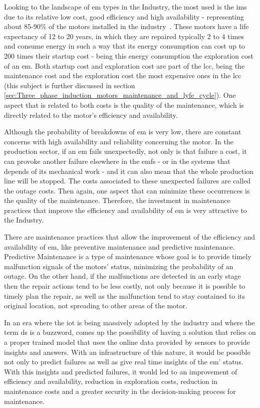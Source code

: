 Looking to the landscape of \acrshort{em} types in the Industry, the most used is the \acrfull{ims} due to its relative low cost, good efficiency and high availability - representing about 85-90\% of the motors installed in the industry~\cite{Ferreira1}. 
These motors have a life expectancy of 12 to 20 years, in which they are repaired typically 2 to 4 times and consume energy in such a way that its energy consumption can cost up to 200 times their startup cost - being this energy consumption the exploration cost of an \acrshort{em}. 
Both startup cost and exploration cost are part of the \acrfull{lcc}, being the maintenance cost and the exploration cost the most expensive ones in the \acrshort{lcc} ~\cite{Ferreira1} (this subject is further discussed in section \ref{sec:Three_phase_induction_motors_maintenance_and_lyfe_cycle}). One aspect that is related to both costs is the quality of the maintenance, which is directly related to the motor's efficiency and availability. 

Although the probability of breakdowns of \acrshort{em} is very low, there are constant concerns with high availability and reliability concerning the motor.
In the production sector, if an \acrshort{em} fails unexpectedly, not only is that failure a cost, it can provoke another failure elsewhere in the  \acrshort{emfs} - or in the systems that depends of its mechanical work - and it can also mean that the whole production line will be stopped. The costs associated to these unexpected failures are called the outage costs. Then again, one aspect that can minimize these occurrences is the quality of the maintenance. Therefore, the investment in maintenance practices that improve the efficiency and availability of \acrshort{em} is very attractive to the Industry.

There are maintenance practices that allow the improvement of the efficiency and availability of \acrshort{em}, like preventive maintenance and predictive maintenance. 
Predictive Maintenance is a type of maintenance whose goal is to provide timely malfunction signals of the motors' status, minimizing the probability of an outage.  
On the other hand, if the malfunctions are detected in an early stage then the repair actions tend to be less costly, not only because it is possible to timely plan the repair, as well as the malfunction tend to stay contained to its original location, not spreading to other areas of the motor.

In an era where the \acrfull{iot} is being massively adopted by the industry and where the term \acrfull{ds} is a buzzword, comes up the possibility of having a solution that relies on a proper trained model that uses the online data provided by sensors to provide insights and answers. 
With an infrastructure of this nature, it would be possible not only to predict failures as well as give real time insights of the \acrshort{em}' status. With this insights and predicted failures, it would led to an improvement of efficiency and availability, reduction in exploration costs, reduction in maintenance costs and a greater security in the decision-making process for maintenance.

